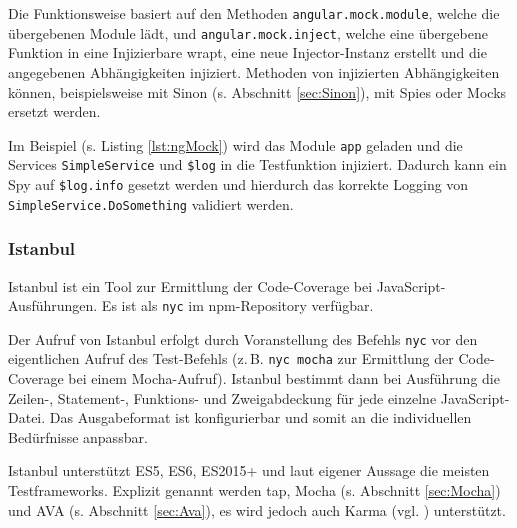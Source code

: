 Die Funktionsweise basiert auf den Methoden \texttt{angular.mock.module}, welche die übergebenen Module lädt\cite{angular-ngMockModule}, und \texttt{angular.mock.inject}, welche eine übergebene Funktion in eine Injizierbare wrapt, eine neue Injector-Instanz erstellt und die angegebenen Abhängigkeiten injiziert\cite{angular-ngMockInject}. Methoden von injizierten Abhängigkeiten können, beispielsweise mit Sinon (s. Abschnitt \ref{sec:Sinon}), mit Spies oder Mocks ersetzt werden.

\begin{figure}[H]
	
\end{figure}

Im Beispiel (s. Listing \ref{lst:ngMock}) wird das Module \texttt{app} geladen und die Services \texttt{SimpleService} und \texttt{\$log} in die Testfunktion injiziert. Dadurch kann ein Spy auf \texttt{\$log.info} gesetzt werden und hierdurch das korrekte Logging von \texttt{SimpleService.DoSomething} validiert werden.

\subsubsection{Istanbul}
Istanbul ist ein Tool zur Ermittlung der Code-Coverage bei JavaScript-Ausführungen. Es ist als \texttt{nyc} im npm-Repository verfügbar.\cite{istanbul}

Der Aufruf von Istanbul erfolgt durch Voranstellung des Befehls \texttt{nyc} vor den eigentlichen Aufruf des Test-Befehls (z.\,B. \texttt{nyc mocha} zur Ermittlung der Code-Coverage bei einem Mocha-Aufruf). Istanbul bestimmt dann bei Ausführung die Zeilen-, Statement-, Funktions- und Zweigabdeckung für jede einzelne JavaScript-Datei. Das Ausgabeformat ist konfigurierbar und somit an die individuellen Bedürfnisse anpassbar.\cite{istanbul}

Istanbul unterstützt ES5, ES6, ES2015+ und laut eigener Aussage die meisten Testframeworks. Explizit genannt werden tap, Mocha (s. Abschnitt \ref{sec:Mocha}) und AVA (s. Abschnitt \ref{sec:Ava})\cite{istanbul}, es wird jedoch auch Karma (vgl. \cite{istanbul-karma}) unterstützt.